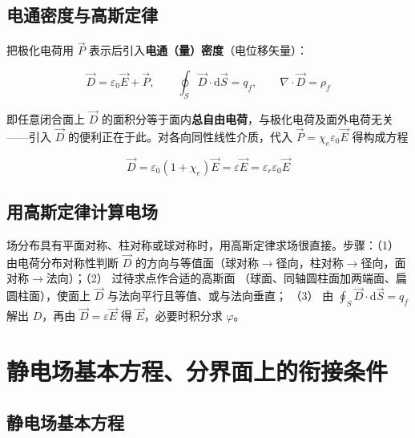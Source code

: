 
\subsection{电通密度与高斯定律}

把极化电荷用 $\vec{P}$ 表示后引入\textbf{电通（量）密度}（电位移矢量）：
\begin{formulaBox}
\[
\vec{D}=\varepsilon_0\vec{E}+\vec{P},
\qquad
\oint_S\vec{D}\cdot\mathrm{d}\vec{S}=q_f,
\qquad
\nabla\cdot\vec{D}=\rho_f
\]
\end{formulaBox}

即任意闭合面上 $\vec{D}$ 的面积分等于面内\textbf{总自由电荷}，与极化电荷及面外电荷无关——引入
$\vec{D}$ 的便利正在于此。对各向同性线性介质，代入 $\vec{P}=\chi_e\varepsilon_0\vec{E}$ 得构成方程
\begin{formulaBox}
\[
\vec{D}=\varepsilon_0(1+\chi_e)\vec{E}=\varepsilon\vec{E}=\varepsilon_r\varepsilon_0\vec{E}
\]
\end{formulaBox}

\subsection{用高斯定律计算电场}

场分布具有平面对称、柱对称或球对称时，用高斯定律求场很直接。步骤：（1） 由电荷分布对称性判断
$\vec{D}$ 的方向与等值面（球对称$\to$径向，柱对称$\to$径向，面对称$\to$法向）；（2） 过待求点作合适的高斯面
（球面、同轴圆柱面加两端面、扁圆柱面），使面上 $\vec{D}$ 与法向平行且等值、或与法向垂直；
（3） 由 $\oint_S\vec{D}\cdot\mathrm{d}\vec{S}=q_f$ 解出 $D$，再由 $\vec{D}=\varepsilon\vec{E}$ 得
$\vec{E}$，必要时积分求 $\varphi$。


\section{静电场基本方程、分界面上的衔接条件}

\subsection{静电场基本方程}


